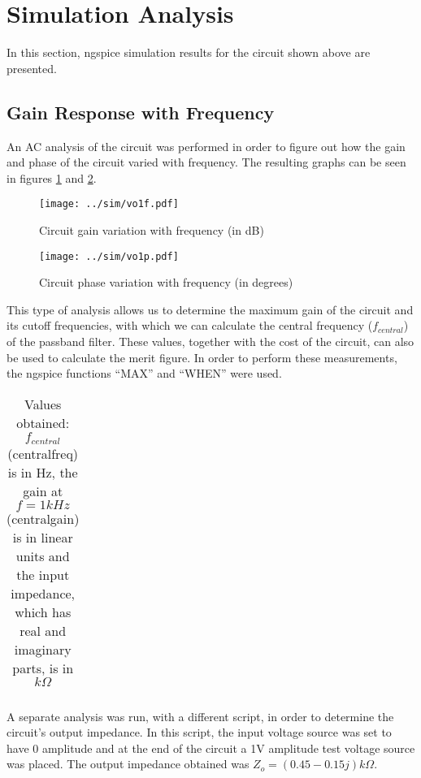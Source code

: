 \section{Simulation Analysis}
\label{sec:simulation}

In this section, ngspice simulation results for the circuit shown above are presented.


\subsection{Gain Response with Frequency}

An AC analysis of the circuit was performed in order to figure out how the gain and phase of the circuit varied with frequency. The resulting graphs can be seen in figures \ref{fig:gain_freq} and \ref{fig:phase_freq}.

\begin{figure}[H] \centering
\texttt{[image: ../sim/vo1f.pdf]}
\caption{Circuit gain variation with frequency (in dB)}
\label{fig:gain_freq}
\end{figure}

\begin{figure}[H] \centering
\texttt{[image: ../sim/vo1p.pdf]}
\caption{Circuit phase variation with frequency (in degrees)}
\label{fig:phase_freq}
\end{figure}

This type of analysis allows us to determine the maximum gain of the circuit and its cutoff frequencies, with which we can calculate the central frequency ($f_{central}$) of the passband filter. These values, together with the cost of the circuit, can also be used to calculate the merit figure. In order to perform these measurements, the ngspice functions ``MAX'' and ``WHEN'' were used.

\begin{table}[H]
  \centering
  \begin{tabular}{|c|c|}
    \hline
      
  \end{tabular}
  \caption{Values obtained: $f_{central}$ (centralfreq) is in Hz, the gain at $f = 1 kHz$ (centralgain) is in linear units and the input impedance, which has real and imaginary parts, is in $k\Omega$}
  \label{tab:resultssim}
\end{table}

A separate analysis was run, with a different script, in order to determine the circuit's output impedance. In this script, the input voltage source was set to have 0 amplitude and at the end of the circuit a 1V amplitude test voltage source was placed. The output impedance obtained was $Z_o = (0.45 - 0.15j) k\Omega$.





